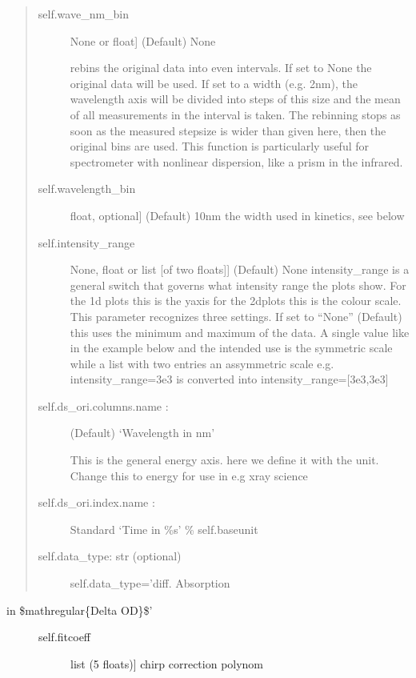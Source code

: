 \documentclass[letterpaper,10pt,english]{sphinxmanual}
\begin{document}
\begin{fulllineitems}
\begin{fulllineitems}
\begin{quote}
\begin{description}
\item[{self.wave\_nm\_bin}] \leavevmode{[}None or float{]}
(Default)  None

rebins the original data into even intervals. If set to None the original data will be used.
If set to a width (e.g. 2nm), the wavelength axis will be divided into steps of this size
and the mean of all measurements in the interval is taken. The re\sphinxhyphen{}binning stops as soon as
the measured stepsize is wider than given here, then the original bins are used.
This function is particularly useful for spectrometer with non\sphinxhyphen{}linear dispersion,
like a prism in the infrared.

\item[{self.wavelength\_bin}] \leavevmode{[}float, optional{]}
(Default)  10nm the width used in kinetics, see below

\item[{self.intensity\_range}] \leavevmode{[}None, float or list {[}of two floats{]}{]}
(Default)  None \sphinxhyphen{} intensity\_range is a general switch that governs what intensity range the plots show.
For the 1d plots this is the y\sphinxhyphen{}axis for the 2d\sphinxhyphen{}plots this is the colour scale.
This parameter recognizes three settings. If set to “None” (Default) this uses the minimum and
maximum of the data. A single value like in the example below and the intended use is the symmetric
scale while a list with two entries an assymmetric scale e.g.
intensity\_range=3e\sphinxhyphen{}3 is converted into intensity\_range={[}\sphinxhyphen{}3e\sphinxhyphen{}3,3e\sphinxhyphen{}3{]}

\item[{self.ds\_ori.columns.name  :}] \leavevmode
(Default)  ‘Wavelength in nm’

This is the general energy axis. here we define it with the unit. Change this to energy for use in e.g x\sphinxhyphen{}ray science

\item[{self.ds\_ori.index.name :}] \leavevmode
Standard ‘Time in \%s’ \% self.baseunit

\item[{self.data\_type: str (optional)}] \leavevmode
self.data\_type=’diff. Absorption

\end{description}
\end{quote}
\begin{description}
\item[{in \$mathregular\{Delta OD\}\$’}] \leavevmode\begin{description}
\item[{self.fitcoeff}] \leavevmode{[}list (5 floats){]}
chirp correction polynom


\end{description}
\end{description}
\end{fulllineitems}
\end{fulllineitems}
\end{document}

